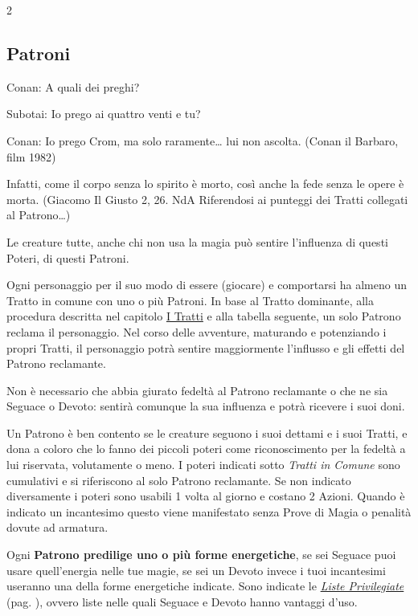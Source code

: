 \begin{multicols}{2}
\subsection{Patroni}\hypertarget{patroni}{}\label{patroni}

\begin{enfasi}{
Conan: A quali dei preghi?

Subotai: Io prego ai quattro venti e tu?

Conan: Io prego Crom, ma solo raramente… lui non ascolta. (Conan il Barbaro, film 1982)

\medskip

Infatti, come il corpo senza lo spirito è morto, così anche la fede senza le opere è morta. (Giacomo Il Giusto 2, 26. NdA Riferendosi ai punteggi dei Tratti collegati al Patrono…)
}
\end{enfasi}

Le creature tutte, anche chi non usa la magia può sentire l'influenza di questi Poteri, di questi Patroni.

Ogni personaggio per il suo modo di essere (giocare) e comportarsi ha almeno un Tratto in comune con uno o più Patroni. In base al Tratto dominante, alla procedura descritta nel capitolo \hyperlink{tratti}{I Tratti} e alla tabella seguente, un solo Patrono reclama il personaggio. Nel corso delle avventure, maturando e potenziando i propri Tratti, il personaggio potrà sentire maggiormente l'influsso e gli effetti del Patrono reclamante.

Non è necessario che abbia giurato fedeltà al Patrono reclamante o che ne sia Seguace o Devoto: sentirà comunque la sua influenza e potrà ricevere i suoi doni.

Un Patrono è ben contento se le creature seguono i suoi dettami e i suoi Tratti, e dona a coloro che lo fanno dei piccoli poteri come riconoscimento per la fedeltà a lui riservata, volutamente o meno. I poteri indicati sotto \emph{Tratti in Comune} sono cumulativi e si riferiscono al solo Patrono reclamante. Se non indicato diversamente i poteri sono usabili 1 volta al giorno e costano 2 Azioni.
Quando è indicato un incantesimo questo viene manifestato senza Prove di Magia o penalità dovute ad armatura.

Ogni \textbf{Patrono predilige uno o più forme energetiche}, se sei Seguace puoi usare quell'energia nelle tue magie, se sei un Devoto invece i tuoi incantesimi useranno una della forme energetiche indicate. Sono indicate le \hyperlink{listeprivilegiate}{\emph{Liste Privilegiate}} (pag. \pageref{listeprivilegiate}), ovvero liste nelle quali Seguace e Devoto hanno vantaggi d'uso.


\end{multicols}
